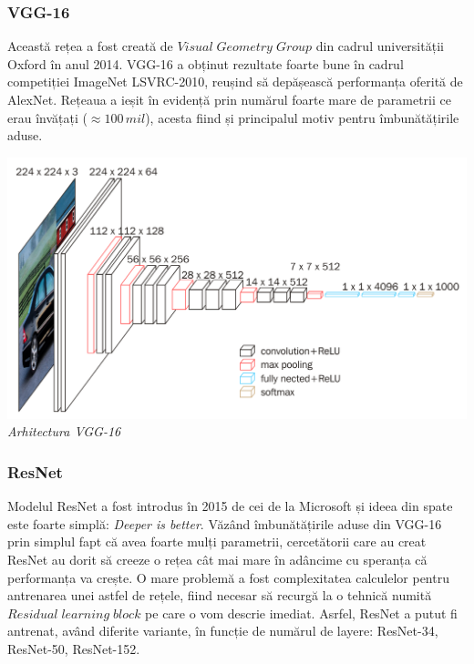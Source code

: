 \subsubsection{VGG-16}
Această rețea a fost creată de $Visual \; Geometry \; Group$ din cadrul universității Oxford în anul 2014. VGG-16 a obținut rezultate foarte bune în cadrul competiției ImageNet LSVRC-2010, reușind să depășească performanța oferită de AlexNet. Rețeaua a ieșit în evidență prin numărul foarte mare de parametrii ce erau învățați ($\approx 100 \, mil$), acesta fiind și principalul motiv pentru îmbunătățirile aduse. \cite{vgg16}

\begin{center}
\includegraphics[scale=1]{vgg16} \\
\textit{Arhitectura VGG-16}
\end{center}

\subsubsection{ResNet}
Modelul ResNet a fost introdus în 2015 de cei de la Microsoft și ideea din spate este foarte simplă: \textit{Deeper is better}. Văzând îmbunătățirile aduse din VGG-16 prin simplul fapt că avea foarte mulți parametrii, cercetătorii care au creat ResNet au dorit să creeze o rețea cât mai mare în adâncime cu speranța că performanța va crește. O mare problemă a fost complexitatea calculelor pentru antrenarea unei astfel de rețele, fiind necesar să recurgă la o tehnică numită $Residual \; learning \; block$ pe care o vom descrie imediat. Asrfel, ResNet a putut fi antrenat, având diferite variante, în funcție de numărul de layere: ResNet-34, ResNet-50, ResNet-152. \cite{resnet}

